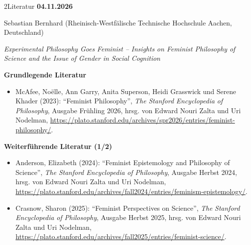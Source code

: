\documentclass[xcolor=table,9pt,aspectratio=169]{beamer}
\begin{document}
\begin{frame}{\vspace*{10mm}2\hspace*{1em}Literatur}
\textbf{04.11.2026}

\smallskip
Sebastian Bernhard (Rheinisch-Westfälische Technische Hochschule Aachen, Deutschland)

\medskip
\textit{Experimental Philosophy Goes Feminist -- Insights on Feminist Philosophy of Science and the Issue of Gender in Social Cognition}


\medskip
\textbf{Grundlegende Literatur}
{\footnotesize
\begin{itemize}[label=,leftmargin=2em,itemindent=-2em]
   \item McAfee, Noëlle, Ann Garry, Anita Superson, Heidi Grasswick und Serene Khader (2023): \enquote{Feminist Philosophy}, \textit{The Stanford Encyclopedia of Philosophy}, Ausgabe Frühling 2026, hrsg. von Edward Nouri Zalta und Uri Nodelman, \url{https://plato.stanford.edu/archives/spr2026/entries/feminist-philosophy/}.
\end{itemize}
}

\medskip
\textbf{Weiterführende Literatur (1/2)}
{\footnotesize
\begin{itemize}[label=,leftmargin=2em,itemindent=-2em]
   \item Anderson, Elizabeth (2024): \enquote{Feminist Epistemology and Philosophy of Science}, \textit{The Stanford Encyclopedia of Philosophy}, Ausgabe Herbst 2024, hrsg. von Edward Nouri Zalta und Uri Nodelman, \url{https://plato.stanford.edu/archives/fall2024/entries/feminism-epistemology/}.
   \item Crasnow, Sharon (2025): \enquote{Feminist Perspectives on Science}, \textit{The Stanford Encyclopedia of Philosophy}, Ausgabe Herbst 2025, hrsg. von Edward Nouri Zalta und Uri Nodelman, \url{https://plato.stanford.edu/archives/fall2025/entries/feminist-science/}.
\end{itemize}
}
\end{frame}
\end{document}
